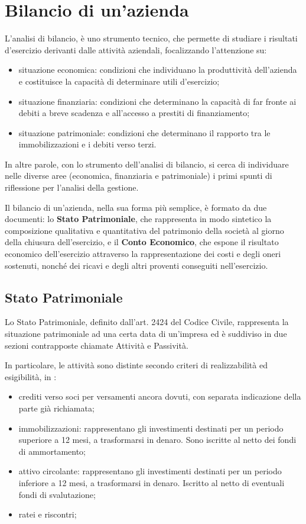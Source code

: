 
\chapter{Bilancio di un'azienda}

L’analisi di bilancio, è uno strumento tecnico, che permette di studiare i risultati d’esercizio derivanti dalle attività aziendali, focalizzando l’attenzione su:
\begin{itemize}
 \item situazione economica: condizioni che individuano la produttività dell’azienda e costituisce la capacità di determinare utili d’esercizio;
 \item situazione finanziaria: condizioni che determinano la capacità di far fronte ai debiti a breve scadenza e all’accesso a prestiti di finanziamento;
 \item situazione patrimoniale: condizioni che determinano il rapporto tra le immobilizzazioni e i debiti verso terzi.
\end{itemize}
In altre parole, con lo strumento dell’analisi di bilancio, si cerca di individuare nelle diverse aree (economica, finanziaria e patrimoniale) i primi spunti di riflessione per l’analisi della gestione.

Il bilancio di un'azienda, nella sua forma più semplice, è formato da due documenti: lo \textbf{Stato Patrimoniale}, che rappresenta in modo sintetico la composizione qualitativa e quantitativa del patrimonio della società al giorno della chiusura dell’esercizio, e il \textbf{Conto Economico}, che espone il risultato economico dell’esercizio attraverso la rappresentazione dei costi e degli oneri sostenuti, nonché dei ricavi e degli altri proventi conseguiti nell’esercizio.



\section{Stato Patrimoniale}

Lo Stato Patrimoniale, definito dall'art. 2424 del Codice Civile, rappresenta la situazione patrimoniale ad una certa data di un'impresa ed è suddiviso in due sezioni contrapposte chiamate Attività e Passività.

In particolare, le attività sono distinte secondo criteri di realizzabilità ed esigibilità, in :
\begin{itemize}
 \item crediti verso soci per versamenti ancora dovuti, con separata indicazione della parte già richiamata;
 \item immobilizzazioni: rappresentano gli investimenti destinati per un periodo superiore a 12 mesi, a trasformarsi in denaro. Sono iscritte al netto dei fondi di ammortamento;
 \item attivo circolante: rappresentano gli investimenti destinati per un periodo inferiore a 12 mesi, a trasformarsi in denaro. Iscritto al netto di eventuali fondi di svalutazione;
 \item ratei e riscontri;
\end{itemize}

